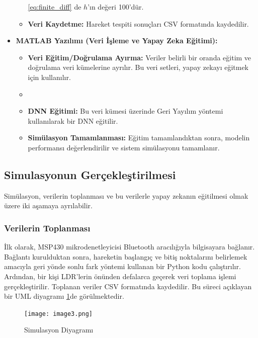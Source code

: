 \begin{itemize}
\begin{itemize}
        \eqref{eq:finite_diff} de \(h\)'ın değeri 100'dür.
        
        \item \textbf{Veri Kaydetme:} Hareket tespiti sonuçları CSV formatında kaydedilir.
    \end{itemize}
    \item \textbf{MATLAB Yazılımı (Veri İşleme ve Yapay Zeka Eğitimi):}
    \begin{itemize}
        \item \textbf{Veri Eğitim/Doğrulama Ayırma:} Veriler belirli bir oranda eğitim ve doğrulama veri kümelerine ayrılır. Bu veri setleri, yapay zekayı eğitmek için kullanılır.

        \item \textbf{}
        
        \item \textbf{DNN Eğitimi:} Bu veri kümesi üzerinde Geri Yayılım yöntemi kullanılarak bir DNN eğitilir.
        
        \item \textbf{Simülasyon Tamamlanması:} Eğitim tamamlandıktan sonra, modelin performansı değerlendirilir ve sistem simülasyonu tamamlanır.
    \end{itemize}
\end{itemize}



\subsection{Simulasyonun Gerçekleştirilmesi}

Simülasyon, verilerin toplanması ve bu verilerle yapay zekanın eğitilmesi olmak üzere iki aşamaya ayrılabilir.


\subsubsection{Verilerin Toplanması}

İlk olarak, MSP430 mikrodenetleyicisi Bluetooth aracılığıyla bilgisayara bağlanır. Bağlantı kurulduktan sonra, hareketin başlangıç ve bitiş noktalarını belirlemek amacıyla geri yönde sonlu fark yöntemi kullanan bir Python kodu çalıştırılır. Ardından, bir kişi LDR'lerin önünden defalarca geçerek veri toplama işlemi gerçekleştirilir. Toplanan veriler CSV formatında kaydedilir. Bu süreci açıklayan bir UML diyagramı \ref{fig:simulasyongerçekleştirmesi}de görülmektedir.


\begin{figure}[H]
    \centering
    \texttt{[image: image3.png]}
    \caption{Simulasyon Diyagramı}
    \label{fig:simulasyongerçekleştirmesi}
\end{figure}


